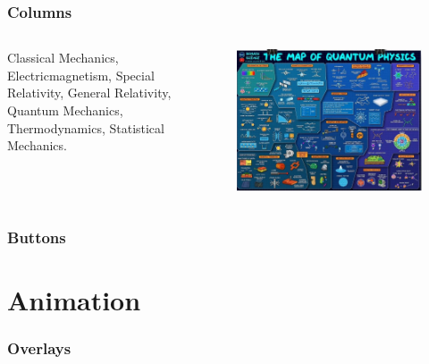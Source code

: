 \documentclass{beamer}
\begin{document}
\begin{frame}
	\frametitle{Columns}
	\begin{columns}
		Classical Mechanics, Electricmagnetism, Special Relativity, General Relativity, Quantum Mechanics, Thermodynamics, Statistical Mechanics.

		\begin{figure}
			\centering
			\includegraphics[width=\columnwidth]{./data/MapQM.jpg}
		\end{figure}

	\end{columns}

\end{frame}


\begin{frame}
	\frametitle{Buttons}
	\hyperlink{contents}{}
	\hyperlink{contents}{}
	\hyperlink{contents}{}
	\hyperlink{contents}{}
\end{frame}



\section{Animation}


\begin{frame}
	\frametitle{Overlays}


\end{frame}
\end{document}
